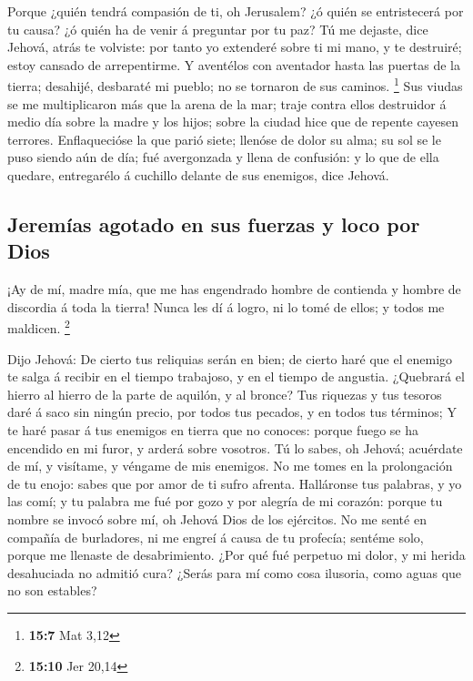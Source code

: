  Porque ¿quién tendrá compasión de ti, oh Jerusalem? ¿ó
quién se entristecerá por tu causa? ¿ó quién ha de venir á preguntar por
tu paz?  Tú me dejaste, dice Jehová, atrás te volviste: por
tanto yo extenderé sobre ti mi mano, y te destruiré; estoy cansado de
arrepentirme.  Y aventélos con aventador hasta las puertas
de la tierra; desahijé, desbaraté mi pueblo; no se tornaron de sus
caminos. \footnote{\textbf{15:7} Mat 3,12}  Sus viudas se me
multiplicaron más que la arena de la mar; traje contra ellos destruidor
á medio día sobre la madre y los hijos; sobre la ciudad hice que de
repente cayesen terrores.  Enflaquecióse la que parió siete;
llenóse de dolor su alma; su sol se le puso siendo aún de día; fué
avergonzada y llena de confusión: y lo que de ella quedare, entregarélo
á cuchillo delante de sus enemigos, dice Jehová.

\hypertarget{jeremuxedas-agotado-en-sus-fuerzas-y-loco-por-dios}{%
\subsection{Jeremías agotado en sus fuerzas y loco por
Dios}\label{jeremuxedas-agotado-en-sus-fuerzas-y-loco-por-dios}}

 ¡Ay de mí, madre mía, que me has engendrado hombre de
contienda y hombre de discordia á toda la tierra! Nunca les dí á logro,
ni lo tomé de ellos; y todos me maldicen. \footnote{\textbf{15:10} Jer
  20,14}

 Dijo Jehová: De cierto tus reliquias serán en bien; de
cierto haré que el enemigo te salga á recibir en el tiempo trabajoso, y
en el tiempo de angustia.  ¿Quebrará el hierro al hierro de
la parte de aquilón, y al bronce?  Tus riquezas y tus
tesoros daré á saco sin ningún precio, por todos tus pecados, y en todos
tus términos;  Y te haré pasar á tus enemigos en tierra que
no conoces: porque fuego se ha encendido en mi furor, y arderá sobre
vosotros.  Tú lo sabes, oh Jehová; acuérdate de mí, y
visítame, y véngame de mis enemigos. No me tomes en la prolongación de
tu enojo: sabes que por amor de ti sufro afrenta. 
Halláronse tus palabras, y yo las comí; y tu palabra me fué por gozo y
por alegría de mi corazón: porque tu nombre se invocó sobre mí, oh
Jehová Dios de los ejércitos.  No me senté en compañía de
burladores, ni me engreí á causa de tu profecía; sentéme solo, porque me
llenaste de desabrimiento.  ¿Por qué fué perpetuo mi dolor,
y mi herida desahuciada no admitió cura? ¿Serás para mí como cosa
ilusoria, como aguas que no son estables?

